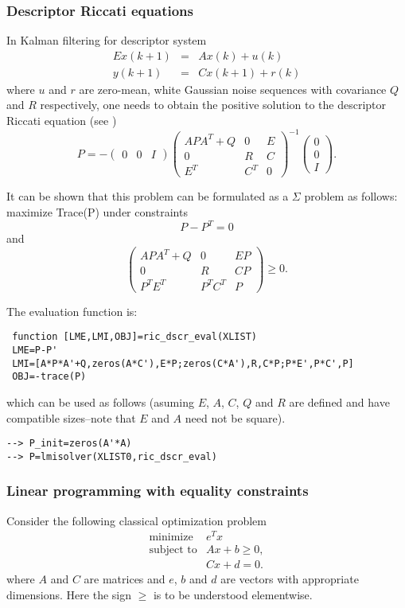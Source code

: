 \documentclass{article}
\begin{document}
\subsubsection{Descriptor Riccati equations}
In Kalman filtering for descriptor system
\begin{eqnarray*}
Ex(k+1)& = & Ax(k) + u(k) \\
y(k+1)&=& Cx(k+1) + r(k)
\end{eqnarray*}
where $u$ and $r$ are zero-mean, white Gaussian noise sequences with 
covariance $Q$ and $R$ respectively, one needs to obtain the positive
solution to the descriptor Riccati equation (see \cite{ramine})
\[
P=-\left( \begin{array}{ccc} 0 & 0 & I \end{array} \right)
\left( \begin{array}{ccc} APA^T + Q & 0 & E \\
                           0   & R & C \\
                            E^T  & C^T & 0 \end{array} \right)^{-1}
\left( \begin{array}{c} 0 \\ 0 \\ I \end{array} \right) .
\]

It can be shown that this problem can be formulated as a $\Sigma$
problem as follows: maximize Trace(P) under constraints
\[
P-P^T=0
\]
and 
\[
\left( \begin{array}{ccc} APA^T + Q & 0 & EP \\
                           0   & R & CP \\
                          P^TE^T  & P^TC^T & P \end{array} \right)
\geq 0 .
\]

The evaluation function is:
\begin{verbatim}
 function [LME,LMI,OBJ]=ric_dscr_eval(XLIST)
 LME=P-P'
 LMI=[A*P*A'+Q,zeros(A*C'),E*P;zeros(C*A'),R,C*P;P*E',P*C',P]
 OBJ=-trace(P)
\end{verbatim}
which can be used as follows (asuming $E$, $A$, $C$, $Q$ and $R$ are
defined and have compatible sizes--note that $E$ and $A$ need not be
square).
\begin{verbatim}
--> P_init=zeros(A'*A)
--> P=lmisolver(XLIST0,ric_dscr_eval)
\end{verbatim}

\subsubsection{Linear programming with equality constraints}
\label{ex4}
Consider the following classical optimization problem
\[
\begin{array}{cc}
\mbox{minimize} & e^Tx \\
\mbox{subject to} & Ax + b \geq 0, \\
& Cx+d = 0.
\end{array}
\]
where $A$ and $C$ are matrices and $e$, $b$ and $d$ are vectors with
appropriate dimensions. Here the sign $\geq$ is to be understood elementwise.
\end{document}
